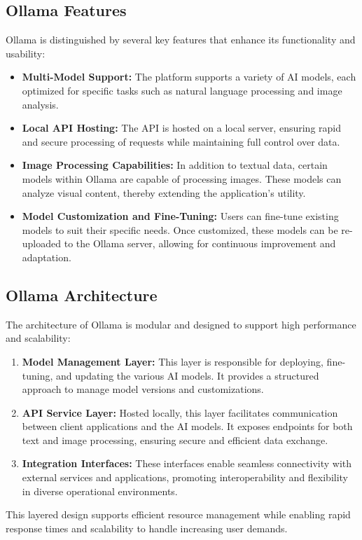 \subsection{Ollama Features}

Ollama is distinguished by several key features that enhance its functionality and usability:
\begin{itemize}
  \item \textbf{Multi-Model Support:} The platform supports a variety of AI models, each optimized for specific tasks such as natural language processing and image analysis.
  \item \textbf{Local API Hosting:} The API is hosted on a local server, ensuring rapid and secure processing of requests while maintaining full control over data.
  \item \textbf{Image Processing Capabilities:} In addition to textual data, certain models within Ollama are capable of processing images. These models can analyze visual content, thereby extending the application’s utility.
  \item \textbf{Model Customization and Fine-Tuning:} Users can fine-tune existing models to suit their specific needs. Once customized, these models can be re-uploaded to the Ollama server, allowing for continuous improvement and adaptation.
\end{itemize}

\subsection{Ollama Architecture}

The architecture of Ollama is modular and designed to support high performance and scalability:
\begin{enumerate}
  \item \textbf{Model Management Layer:} This layer is responsible for deploying, fine-tuning, and updating the various AI models. It provides a structured approach to manage model versions and customizations.
  \item \textbf{API Service Layer:} Hosted locally, this layer facilitates communication between client applications and the AI models. It exposes endpoints for both text and image processing, ensuring secure and efficient data exchange.
  \item \textbf{Integration Interfaces:} These interfaces enable seamless connectivity with external services and applications, promoting interoperability and flexibility in diverse operational environments.
\end{enumerate}
This layered design supports efficient resource management while enabling rapid response times and scalability to handle increasing user demands.

